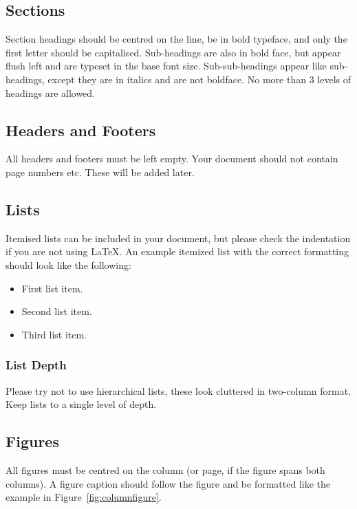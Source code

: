 \documentclass{cmppgr}
\begin{document}
\subsection{Sections}

Section headings should be centred on the line, be in bold typeface, and only the first letter should be capitalised. Sub-headings are also in bold face, but appear flush left and are typeset in the base font size. Sub-sub-headings appear like sub-headings, except they are in italics and are not boldface. No more than 3 levels of headings are allowed.

\subsection{Headers and Footers}

All headers and footers must be left empty. Your document should not contain page numbers etc. These will be added later.

\subsection{Lists}

Itemised lists can be included in your document, but please check the indentation if you are not using \LaTeX. An example itemized list with the correct formatting should look like the following:
%
\begin{itemize}
\item{First list item.}
\item{Second list item.}
\item{Third list item.}
\end{itemize}
%

\subsubsection{List Depth}

Please try not to use hierarchical lists, these look cluttered in two-column format. Keep lists to a single level of depth.

\subsection{Figures}

All figures must be centred on the column (or page, if the figure spans both columns). A figure caption should follow the figure and be formatted like the example in Figure~\ref{fig:columnfigure}.
\end{document}
